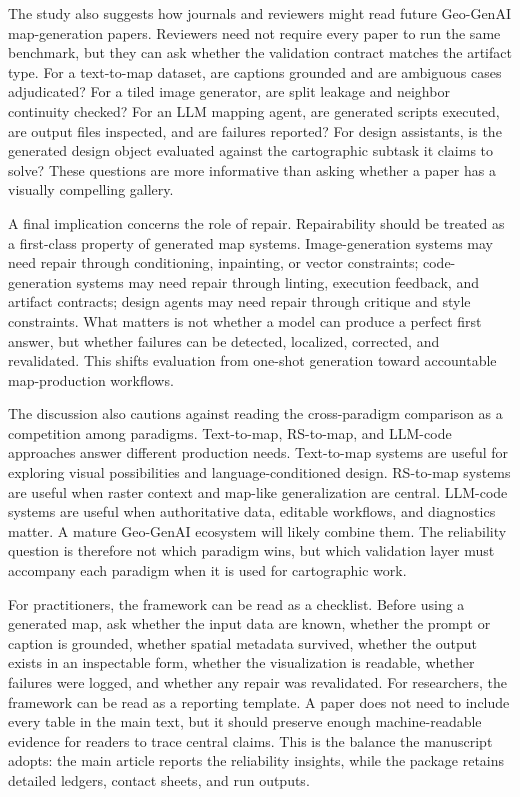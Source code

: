 \documentclass[]{interact}
\begin{document}
The study also suggests how journals and reviewers might read future Geo-GenAI map-generation papers. Reviewers need not require every paper to run the same benchmark, but they can ask whether the validation contract matches the artifact type. For a text-to-map dataset, are captions grounded and are ambiguous cases adjudicated? For a tiled image generator, are split leakage and neighbor continuity checked? For an LLM mapping agent, are generated scripts executed, are output files inspected, and are failures reported? For design assistants, is the generated design object evaluated against the cartographic subtask it claims to solve? These questions are more informative than asking whether a paper has a visually compelling gallery.

A final implication concerns the role of repair. Repairability should be treated as a first-class property of generated map systems. Image-generation systems may need repair through conditioning, inpainting, or vector constraints; code-generation systems may need repair through linting, execution feedback, and artifact contracts; design agents may need repair through critique and style constraints. What matters is not whether a model can produce a perfect first answer, but whether failures can be detected, localized, corrected, and revalidated. This shifts evaluation from one-shot generation toward accountable map-production workflows.

The discussion also cautions against reading the cross-paradigm comparison as a competition among paradigms. Text-to-map, RS-to-map, and LLM-code approaches answer different production needs. Text-to-map systems are useful for exploring visual possibilities and language-conditioned design. RS-to-map systems are useful when raster context and map-like generalization are central. LLM-code systems are useful when authoritative data, editable workflows, and diagnostics matter. A mature Geo-GenAI ecosystem will likely combine them. The reliability question is therefore not which paradigm wins, but which validation layer must accompany each paradigm when it is used for cartographic work.

For practitioners, the framework can be read as a checklist. Before using a generated map, ask whether the input data are known, whether the prompt or caption is grounded, whether spatial metadata survived, whether the output exists in an inspectable form, whether the visualization is readable, whether failures were logged, and whether any repair was revalidated. For researchers, the framework can be read as a reporting template. A paper does not need to include every table in the main text, but it should preserve enough machine-readable evidence for readers to trace central claims. This is the balance the manuscript adopts: the main article reports the reliability insights, while the package retains detailed ledgers, contact sheets, and run outputs.
\end{document}
